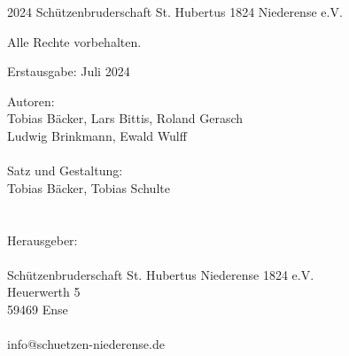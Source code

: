 \begingroup
\footnotesize
\parindent 0pt
\parskip \baselineskip
\textcopyright{} 2024 Schützenbruderschaft St. Hubertus 1824 Niederense e.V.

Alle Rechte vorbehalten.

\lipsum[1-1]


\vfill

Erstausgabe: Juli 2024

Autoren: \\
\hspace*{2em} Tobias Bäcker, Lars Bittis, Roland Gerasch \\
\hspace*{2em} Ludwig Brinkmann, Ewald Wulff \\
\\
Satz und Gestaltung: \\
\hspace*{2em} Tobias Bäcker, Tobias Schulte \\
\\
\\
Herausgeber: \\
\\
\hspace*{2em} Schützenbruderschaft St. Hubertus Niederense 1824 e.V. \\
\hspace*{2em} Heuerwerth 5 \\
\hspace*{2em} 59469 Ense \\
\\
\hspace*{2em} info@schuetzen-niederense.de

\endgroup
\clearpage